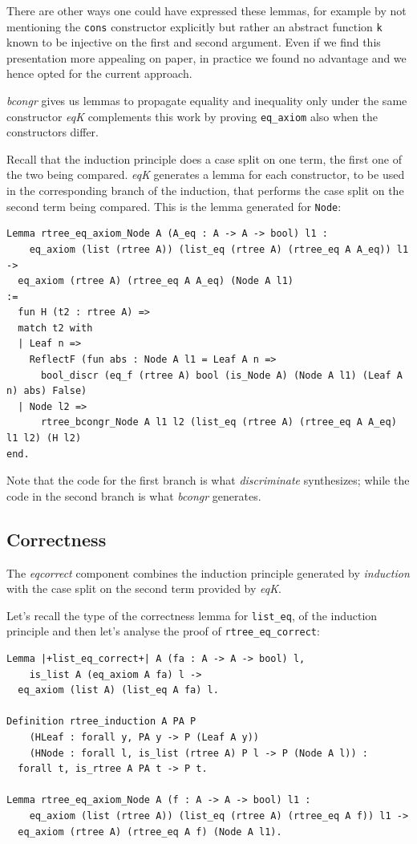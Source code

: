 \documentclass[a4paper,UKenglish,cleveref, autoref]{lipics-v2019}
\newcommand{\derive}[1]{\emph{#1}}
\begin{document}
There are other ways one could have expressed these lemmas,
for example by not mentioning the \lstinline+cons+
constructor explicitly but rather an abstract function \lstinline+k+
known to be injective on the first and second argument.
Even if we find this presentation more appealing on paper, in practice
we found no advantage and we hence opted for the current approach.

\derive{bcongr} gives us lemmas to propagate
equality and inequality only under the same constructor
\derive{eqK} complements this work 
by proving \lstinline+eq_axiom+ also when the constructors differ.

Recall that the induction principle does a case split on one term, the first
one of the two being compared.  \derive{eqK} generates a lemma for each
constructor, to be used in the corresponding branch of the induction, that
performs the case split on the second term being compared.  This is the lemma
generated for \lstinline+Node+:

\begin{lstlisting}
Lemma rtree_eq_axiom_Node A (A_eq : A -> A -> bool) l1 :
    eq_axiom (list (rtree A)) (list_eq (rtree A) (rtree_eq A A_eq)) l1 ->
  eq_axiom (rtree A) (rtree_eq A A_eq) (Node A l1)
:=
  fun H (t2 : rtree A) =>
  match t2 with
  | Leaf n =>
    ReflectF (fun abs : Node A l1 = Leaf A n =>
      bool_discr (eq_f (rtree A) bool (is_Node A) (Node A l1) (Leaf A n) abs) False)
  | Node l2 =>
      rtree_bcongr_Node A l1 l2 (list_eq (rtree A) (rtree_eq A A_eq) l1 l2) (H l2)
end.
\end{lstlisting}

\noindent
Note that the code for the first branch is what
\derive{discriminate} synthesizes; while the code
in the second branch is what \derive{bcongr} generates.

\subsection{Correctness} %
\label{sec:derive:eqcorrect}

The \derive{eqcorrect} component combines the induction
principle generated by \derive{induction} with the
case split on the second term provided by \derive{eqK}.

Let's recall the type of the correctness lemma for
\lstinline+list_eq+, of the induction principle
and then let's analyse the proof of
\lstinline+rtree_eq_correct+:

\begin{lstlisting}
Lemma |+list_eq_correct+| A (fa : A -> A -> bool) l,
    is_list A (eq_axiom A fa) l ->
  eq_axiom (list A) (list_eq A fa) l.

Definition rtree_induction A PA P  
    (HLeaf : forall y, PA y -> P (Leaf A y))
    (HNode : forall l, is_list (rtree A) P l -> P (Node A l)) :
  forall t, is_rtree A PA t -> P t.

Lemma rtree_eq_axiom_Node A (f : A -> A -> bool) l1 :
    eq_axiom (list (rtree A)) (list_eq (rtree A) (rtree_eq A f)) l1 ->
  eq_axiom (rtree A) (rtree_eq A f) (Node A l1).
\end{lstlisting}
       
\end{document}
